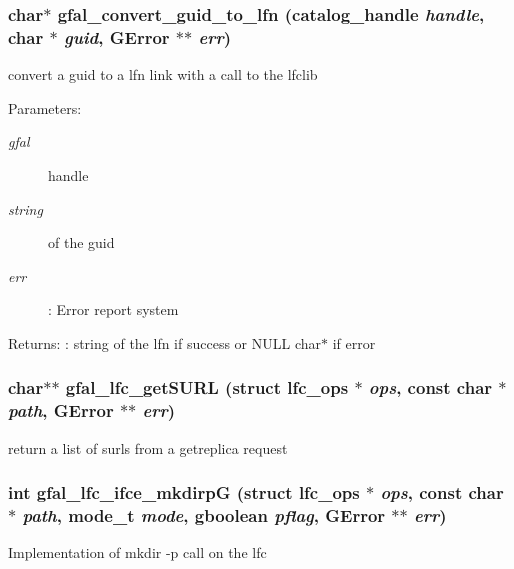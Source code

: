 \subsubsection{\setlength{\rightskip}{0pt plus 5cm}char$\ast$ gfal\_\-convert\_\-guid\_\-to\_\-lfn (catalog\_\-handle {\em handle}, char $\ast$ {\em guid}, GError $\ast$$\ast$ {\em err})}\label{lfc__ifce__ng_8c_c4daecd5aa0938a99eb86c367a0050f1}


convert a guid to a lfn link with a call to the lfclib \begin{Desc}
\item[Parameters:]
\begin{description}
\item[{\em gfal}]handle \item[{\em string}]of the guid \item[{\em err}]: Error report system \end{description}
\end{Desc}
\begin{Desc}
\item[Returns:]: string of the lfn if success or NULL char$\ast$ if error \end{Desc}
\subsubsection{\setlength{\rightskip}{0pt plus 5cm}char$\ast$$\ast$ gfal\_\-lfc\_\-get\-SURL (struct lfc\_\-ops $\ast$ {\em ops}, const char $\ast$ {\em path}, GError $\ast$$\ast$ {\em err})}\label{lfc__ifce__ng_8c_26c355c9cf576886a743ab1917de295d}


return a list of surls from a getreplica request 
\subsubsection{\setlength{\rightskip}{0pt plus 5cm}int gfal\_\-lfc\_\-ifce\_\-mkdirp\-G (struct lfc\_\-ops $\ast$ {\em ops}, const char $\ast$ {\em path}, mode\_\-t {\em mode}, gboolean {\em pflag}, GError $\ast$$\ast$ {\em err})}\label{lfc__ifce__ng_8c_9fa43925882e2e196e0020b529827d3c}


Implementation of mkdir -p call on the lfc 
